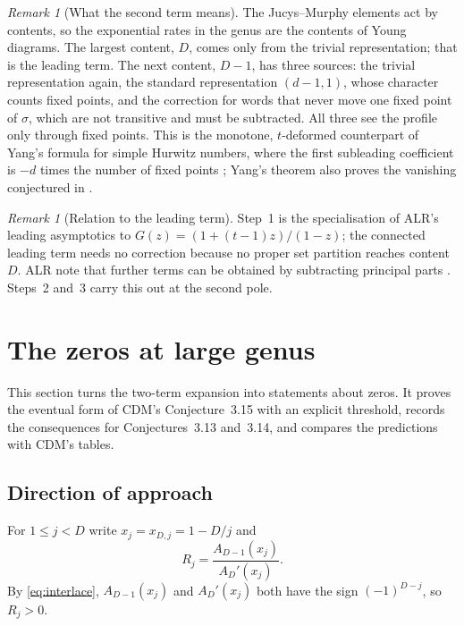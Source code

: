 \documentclass[11pt,a4paper]{article}
\theoremstyle{definition}\newtheorem{definition}[theorem]{Definition}
\theoremstyle{remark}\newtheorem{remark}[theorem]{Remark}\newtheorem{example}[theorem]{Example}
\numberwithin{equation}{section}
\begin{document}
\begin{remark}[What the second term means]\label{rem:mechanism}
The Jucys--Murphy elements act by contents, so the exponential rates in the genus are the contents of Young diagrams. The largest content, $D$, comes only from the trivial representation; that is the leading term. The next content, $D-1$, has three sources: the trivial representation again, the standard representation $(d-1,1)$, whose character counts fixed points, and the correction for words that never move one fixed point of $\sigma$, which are not transitive and must be subtracted. All three see the profile only through fixed points. This is the monotone, $t$-deformed counterpart of Yang's formula for simple Hurwitz numbers, where the first subleading coefficient is $-d$ times the number of fixed points \cite[Theorem~1.3]{yang}; Yang's theorem also proves the vanishing conjectured in \cite[Conjecture~4.1]{dhr}.
\end{remark}

\begin{remark}[Relation to the leading term]\label{rem:alr}
Step~1 is the specialisation of ALR's leading asymptotics \cite[Lemma~2.3, Theorem~6 and Theorem~C]{alr} to $G(z)=(1+(t-1)z)/(1-z)$; the connected leading term needs no correction because no proper set partition reaches content $D$. ALR note that further terms can be obtained by subtracting principal parts \cite[Remark~2.2]{alr}. Steps~2 and~3 carry this out at the second pole.
\end{remark}

\section{The zeros at large genus}\label{sec:zeros}
This section turns the two-term expansion into statements about zeros. It proves the eventual form of CDM's Conjecture~3.15 with an explicit threshold, records the consequences for Conjectures~3.13 and~3.14, and compares the predictions with CDM's tables.

\subsection{Direction of approach}
For $1\le j<D$ write $x_j=x_{D,j}=1-D/j$ and
\[
 R_j=\frac{A_{D-1}(x_j)}{A_D'(x_j)} .
\]
By \eqref{eq:interlace}, $A_{D-1}(x_j)$ and $A_D'(x_j)$ both have the sign $(-1)^{D-j}$, so $R_j>0$.
\end{document}
